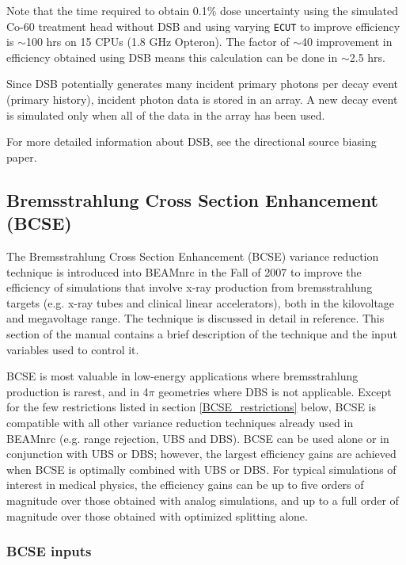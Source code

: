 \documentclass[12pt,twoside]{article}
\begin{document}
Note that the time required to obtain 0.1\% dose uncertainty using the simulated Co-60 treatment
head\cite{Mo99} without DSB and using varying {\tt ECUT} to improve efficiency is $\sim$100 hrs on 15 CPUs (1.8 GHz Opteron).  The factor of $\sim$40 improvement in efficiency obtained using DSB means this calculation can be done in
$\sim$2.5 hrs.

Since DSB potentially generates many incident primary photons per decay event (primary history), incident photon data is
stored in an array. A new decay event is simulated only when all of the data in the array has been used.

For more detailed information about DSB, see the directional source biasing paper\cite{Wa15}.

\subsection[BCSE]{Bremsstrahlung Cross Section Enhancement (BCSE)}
\label{BCSE}

The Bremsstrahlung Cross Section Enhancement (BCSE) variance reduction
technique is introduced into BEAMnrc in the Fall of 2007 to improve
the efficiency of simulations that involve x-ray production from
bremsstrahlung targets (e.g. x-ray tubes and clinical linear
accelerators), both in the kilovoltage and megavoltage range. The
technique is discussed in detail in reference\cite{AR07}. This
section of the manual contains a brief description of the technique
and the input variables used to control it.

BCSE is most valuable in low-energy applications where bremsstrahlung
production is rarest, and in 4$\pi$ geometries where DBS is not
applicable. Except for the few restrictions listed in section
\ref{BCSE_restrictions} below, BCSE is compatible with all other
variance reduction techniques already used in BEAMnrc (e.g. range
rejection, UBS and DBS). BCSE can be used alone or in conjunction with
UBS or DBS; however, the largest efficiency gains are achieved when
BCSE is optimally combined with UBS or DBS. For typical simulations of
interest in medical physics, the efficiency gains can be up to five
orders of magnitude over those obtained with analog simulations, and
up to a full order of magnitude over those obtained with optimized
splitting alone.

\subsubsection{BCSE inputs}
\end{document}
